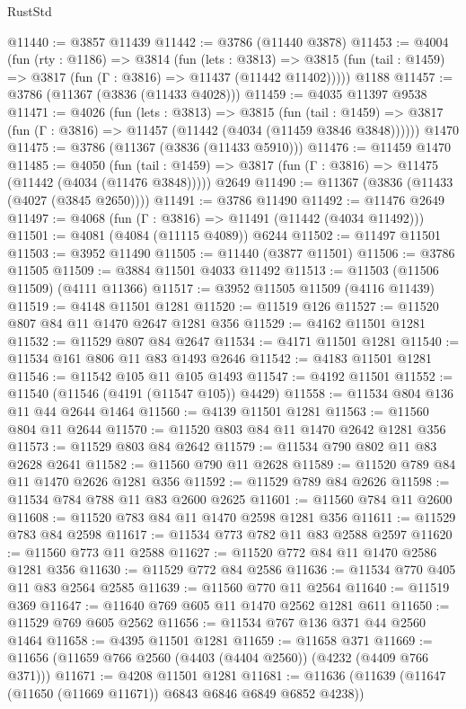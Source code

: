 \begin{lexlean}{RustStd}
\begin{coremodule}
@11440 := @3857 @11439
@11442 := @3786 (@11440 @3878)
@11453 := @4004
    (fun (rty : @1186) =>
    @3814
      (fun (lets : @3813) =>
      @3815 (fun (tail : @1459) => @3817 (fun (Γ : @3816) => @11437 (@11442 @11402)))))
    @1188
@11457 := @3786 (@11367 (@3836 (@11433 @4028)))
@11459 := @4035 @11397 @9538
@11471 := @4026
    (fun (lets : @3813) =>
    @3815
      (fun (tail : @1459) =>
      @3817 (fun (Γ : @3816) => @11457 (@11442 (@4034 (@11459 @3846 @3848))))))
    @1470
@11475 := @3786 (@11367 (@3836 (@11433 @5910)))
@11476 := @11459 @1470
@11485 := @4050
    (fun (tail : @1459) => @3817 (fun (Γ : @3816) => @11475 (@11442 (@4034 (@11476 @3848)))))
    @2649
@11490 := @11367 (@3836 (@11433 (@4027 (@3845 @2650))))
@11491 := @3786 @11490
@11492 := @11476 @2649
@11497 := @4068 (fun (Γ : @3816) => @11491 (@11442 (@4034 @11492)))
@11501 := @4081 (@4084 (@11115 @4089)) @6244
@11502 := @11497 @11501
@11503 := @3952 @11490
@11505 := @11440 (@3877 @11501)
@11506 := @3786 @11505
@11509 := @3884 @11501 @4033 @11492
@11513 := @11503 (@11506 @11509) (@4111 @11366)
@11517 := @3952 @11505 @11509 (@4116 @11439)
@11519 := @4148 @11501 @1281
@11520 := @11519 @126
@11527 := @11520 @807 @84 @11 @1470 @2647 @1281 @356
@11529 := @4162 @11501 @1281
@11532 := @11529 @807 @84 @2647
@11534 := @4171 @11501 @1281
@11540 := @11534 @161 @806 @11 @83 @1493 @2646
@11542 := @4183 @11501 @1281
@11546 := @11542 @105 @11 @105 @1493
@11547 := @4192 @11501
@11552 := @11540 (@11546 (@4191 (@11547 @105)) @4429)
@11558 := @11534 @804 @136 @11 @44 @2644 @1464
@11560 := @4139 @11501 @1281
@11563 := @11560 @804 @11 @2644
@11570 := @11520 @803 @84 @11 @1470 @2642 @1281 @356
@11573 := @11529 @803 @84 @2642
@11579 := @11534 @790 @802 @11 @83 @2628 @2641
@11582 := @11560 @790 @11 @2628
@11589 := @11520 @789 @84 @11 @1470 @2626 @1281 @356
@11592 := @11529 @789 @84 @2626
@11598 := @11534 @784 @788 @11 @83 @2600 @2625
@11601 := @11560 @784 @11 @2600
@11608 := @11520 @783 @84 @11 @1470 @2598 @1281 @356
@11611 := @11529 @783 @84 @2598
@11617 := @11534 @773 @782 @11 @83 @2588 @2597
@11620 := @11560 @773 @11 @2588
@11627 := @11520 @772 @84 @11 @1470 @2586 @1281 @356
@11630 := @11529 @772 @84 @2586
@11636 := @11534 @770 @405 @11 @83 @2564 @2585
@11639 := @11560 @770 @11 @2564
@11640 := @11519 @369
@11647 := @11640 @769 @605 @11 @1470 @2562 @1281 @611
@11650 := @11529 @769 @605 @2562
@11656 := @11534 @767 @136 @371 @44 @2560 @1464
@11658 := @4395 @11501 @1281
@11659 := @11658 @371
@11669 := @11656 (@11659 @766 @2560 (@4403 (@4404 @2560)) (@4232 (@4409 @766 @371)))
@11671 := @4208 @11501 @1281
@11681 := @11636 (@11639 (@11647 (@11650 (@11669 @11671)) @6843 @6846 @6849 @6852 @4238))

\end{coremodule}
\end{lexlean}
